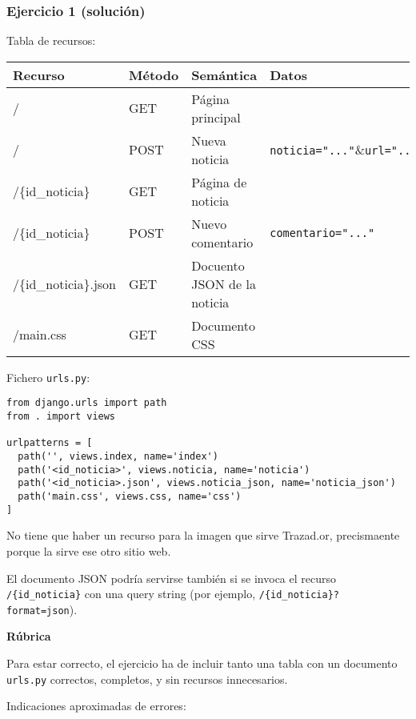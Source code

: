 \subsubsection{Ejercicio 1 (solución)}

Tabla de recursos:
\vspace{.4cm}

\begin{tabular}{|l|l|l|l|}
  \hline
  Recurso & Método & Semántica & Datos \\ \hline\hline
  /       & GET    & Página principal & \\
  /       & POST   & Nueva noticia & \texttt{noticia="..."}\&\texttt{url="..."} \\
  /\{id\_noticia\} & GET & Página de noticia & \\
  /\{id\_noticia\} & POST & Nuevo comentario & \texttt{comentario="..."} \\
  /\{id\_noticia\}.json & GET & Docuento JSON de la noticia & \\
  /main.css & GET & Documento CSS &  \\
  \hline
\end{tabular}

\vspace{.4cm}
Fichero \texttt{urls.py}:

\begin{verbatim}
from django.urls import path
from . import views

urlpatterns = [
  path('', views.index, name='index')
  path('<id_noticia>', views.noticia, name='noticia')
  path('<id_noticia>.json', views.noticia_json, name='noticia_json')
  path('main.css', views.css, name='css')
]
\end{verbatim}

No tiene que haber un recurso para la imagen que sirve Trazad.or, precismaente porque la sirve ese otro sitio web.

El documento JSON podría servirse también si se invoca el recurso \texttt{/\{id\_noticia\}} con una query string (por ejemplo, \texttt{/\{id\_noticia\}?format=json}).

\vspace{.4cm}\textbf{Rúbrica}

Para estar correcto, el ejercicio ha de incluir tanto una tabla con un documento \texttt{urls.py} correctos, completos, y sin recursos innecesarios.

Indicaciones aproximadas de errores:

